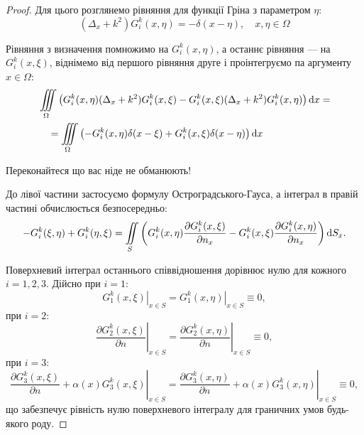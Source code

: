 \begin{proof}
	Для цього розглянемо рівняння для функції Гріна з параметром $\eta$:
	\begin{equation}
		(\Delta_x + k^2) G_i^k(x, \eta) = -\delta(x - \eta), \quad x, \eta \in \Omega
	\end{equation}

	Рівняння з визначення помножимо на $G_i^k(x, \eta)$, а останнє рівняння --- на $G_i^k(x, \xi)$, віднімемо від першого рівняння друге і проінтегруємо па аргументу $x \in \Omega$:
	\begin{equation}
		\begin{aligned}
			& \displaystyle\iiint\limits_\Omega \left( G_i^k(x, \eta) (\Delta_x + k^2) G_i^k(x, \xi) - G_i^k(x, \xi) (\Delta_x + k^2) G_i^k(x, \eta) \right) \mathop{}\!\mathrm{d} x = \\
			& \quad = \displaystyle\iiint\limits_\Omega \left( -G_i^k(x, \eta) \delta(x - \xi) + G_i^k(x, \xi) \delta(x - \eta) \right) \mathop{}\!\mathrm{d} x
		\end{aligned}
	\end{equation}

	\begin{exercise}
		Переконайтеся що вас ніде не обманюють!
	\end{exercise}

	До лівої частини застосуємо формулу Остроградського-Гауса, а інтеграл в правій частині обчислюється безпосередньо:
	\begin{equation}
		-G_i^k(\xi, \eta) + G_i^k(\eta, \xi) = \displaystyle\iint\limits_S \left( G_i^k(x, \eta) \frac{\partial G_i^k(x, \xi)}{\partial n_x} - G_i^k(x, \xi) \frac{\partial G_i^k(x, \eta)}{\partial n_x} \right) \mathop{}\!\mathrm{d} S_x.
	\end{equation}

	Поверхневий інтеграл останнього співвідношення дорівнює нулю для кожного $i = 1, 2, 3$. Дійсно при $i = 1$:
	\begin{equation}
		\left. G_1^k(x, \xi) \right|_{x \in S} = \left. G_1^k(x, \eta) \right|_{x \in S} \equiv 0,
	\end{equation}
	при $i = 2$:
	\begin{equation}
		\left. \frac{\partial G_2^k(x, \xi)}{\partial n} \right|_{x \in S} = \left. \frac{\partial G_2^k(x, \eta)}{\partial n} \right|_{x \in S} \equiv 0,
	\end{equation}
	при $i = 3$:
	\begin{equation}
		\left. \frac{\partial G_3^k(x, \xi)}{\partial n} + \alpha(x) G_3^k(x, \xi) \right|_{x \in S} = \left. \frac{\partial G_3^k(x, \eta)}{\partial n} + \alpha(x) G_3^k(x, \eta) \right|_{x \in S} \equiv 0,
	\end{equation}
	що забезпечує рівність нулю поверхневого інтегралу для граничних умов будь-якого роду.
\end{proof}


